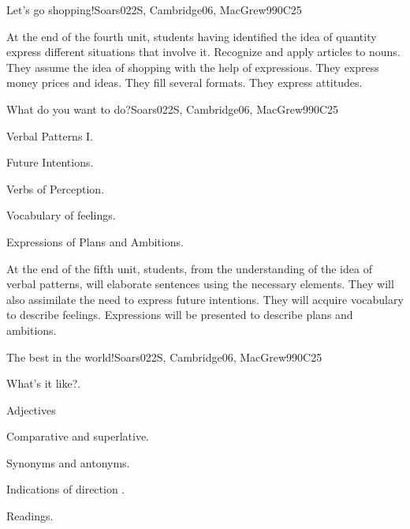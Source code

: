 \begin{syllabus}
\begin{unit}{Let's go shopping!}{}{Soars022S, Cambridge06, MacGrew99}{0}{C25}
   \begin{learningoutcomes}
      \item At the end  of the fourth unit, students having identified the idea of quantity express different situations that involve it. Recognize and apply articles to nouns. They assume the idea of shopping with the help of expressions. They express money prices and ideas. They fill several formats. They express attitudes.
   \end{learningoutcomes}

\end{unit}

\begin{unit}{What do you want to do?}{}{Soars022S, Cambridge06, MacGrew99}{0}{C25}
   \begin{topics}
      \item Verbal Patterns I.
      \item Future Intentions.
      \item Verbs of Perception.
      \item Vocabulary of feelings.
      \item Expressions of Plans and Ambitions.
   \end{topics}

   \begin{learningoutcomes}
      \item At the end of the fifth unit, students, from the understanding of the idea of verbal patterns, will elaborate sentences using the necessary elements. They will also assimilate the need to express future intentions. They will acquire vocabulary to describe feelings. Expressions will be presented to describe plans and ambitions.
   \end{learningoutcomes}
\end{unit}

\begin{unit}{The best in the world!}{}{Soars022S, Cambridge06, MacGrew99}{0}{C25}
   \begin{topics}
      \item What's it like?.
      \item Adjectives 
      \item Comparative and superlative.
      \item Synonyms and antonyms. 
      \item Indications of direction .
      \item Readings.
   \end{topics}


\end{unit}
\end{syllabus}
